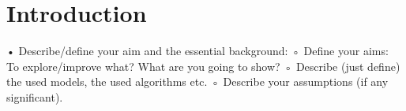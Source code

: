 \section{Introduction}



• Describe/define  your aim and the essential  background: 
	◦ Define your aims: To explore/improve what? What are you going to show? 
	◦ Describe (just define) the used models, the used algorithms  etc. 
	◦ Describe your assumptions (if any significant).
